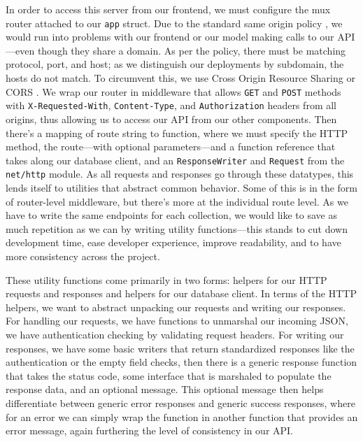 \documentclass[11pt, twoside, reqno]{book}
\begin{document}
In order to access this server from our frontend, we must configure the mux router \cite{muxGoril57:online} attached to our \texttt{app} struct. Due to the standard same origin policy \cite{CrossOri30:online}, we would run into problems with our frontend or our model making calls to our API—even though they share a domain. As per the policy, there must be matching protocol, port, and host; as we distinguish our deployments by subdomain, the hosts do not match. To circumvent this, we use Cross Origin Resource Sharing or CORS \cite{CrossOri23:online}. We wrap our router in middleware that allows \texttt{GET} and \texttt{POST} methods with \texttt{X-Requested-With}, \texttt{Content-Type}, and \texttt{Authorization} headers from all origins, thus allowing us to access our API from our other components. Then there's a mapping of route string to function, where we must specify the HTTP method, the route—with optional parameters—and a function reference that takes along our database client, and an \texttt{ResponseWriter} and \texttt{Request} from the \texttt{net/http} module. As all requests and responses go through these datatypes, this lends itself to utilities that abstract common behavior. Some of this is in the form of router-level middleware, but there's more at the individual route level. As we have to write the same endpoints for each collection, we would like to save as much repetition as we can by writing utility functions—this stands to cut down development time, ease developer experience, improve readability, and to have more consistency across the project.

These utility functions come primarily in two forms: helpers for our HTTP requests and responses and helpers for our database client. In terms of the HTTP helpers, we want to abstract unpacking our requests and writing our responses. For handling our requests, we have functions to unmarshal our incoming JSON, we have authentication checking by validating request headers. For writing our responses, we have some basic writers that return standardized responses like the authentication or the empty field checks, then there is a generic response function that takes the status code, some interface that is marshaled to populate the response data, and an optional message. This optional message then helps differentiate between generic error responses and generic success responses, where for an error we can simply wrap the function in another function that provides an error message, again furthering the level of consistency in our API.
\end{document}
